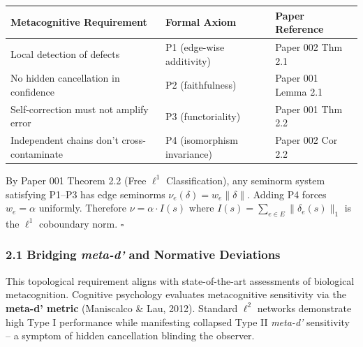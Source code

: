 \documentclass[
]{article}
\begin{document}
\begin{longtable}[]{@{}
  >{\raggedright\arraybackslash}p{}
  >{\raggedright\arraybackslash}p{}
  >{\raggedright\arraybackslash}p{}@{}}
\toprule\noalign{}
\begin{minipage}[b]{\linewidth}\raggedright
Metacognitive Requirement
\end{minipage} & \begin{minipage}[b]{\linewidth}\raggedright
Formal Axiom
\end{minipage} & \begin{minipage}[b]{\linewidth}\raggedright
Paper Reference
\end{minipage} \\
\midrule\noalign{}
\endhead
\bottomrule\noalign{}
\endlastfoot
Local detection of defects & P1 (edge-wise additivity) & Paper 002 Thm
2.1 \\
No hidden cancellation in confidence & P2 (faithfulness) & Paper 001
Lemma 2.1 \\
Self-correction must not amplify error & P3 (functoriality) & Paper 001
Thm 2.2 \\
Independent chains don't cross-contaminate & P4 (isomorphism invariance)
& Paper 002 Cor 2.2 \\
\end{longtable}

By Paper 001 Theorem 2.2 (Free \(\ell^1\) Classification), any seminorm
system satisfying P1--P3 has edge seminorms
\(\nu_e(\delta) = w_e \|\delta\|\). Adding P4 forces \(w_e = \alpha\)
uniformly. Therefore \(\nu = \alpha \cdot I(s)\) where
\(I(s) = \sum_{e \in E} \|\delta_e(s)\|_1\) is the \(\ell^1\) coboundary
norm. \(\square\)

\subsubsection{\texorpdfstring{2.1 Bridging \emph{meta-d'} and Normative
Deviations}{2.1 Bridging meta-d' and Normative Deviations}}\label{bridging-meta-d-and-normative-deviations}

This topological requirement aligns with state-of-the-art assessments of
biological metacognition. Cognitive psychology evaluates metacognitive
sensitivity via the \textbf{meta-d' metric} (Maniscalco \& Lau, 2012).
Standard \(\ell^2\) networks demonstrate high Type I performance while
manifesting collapsed Type II \emph{meta-d'} sensitivity -- a symptom of
hidden cancellation blinding the observer.
\end{document}
